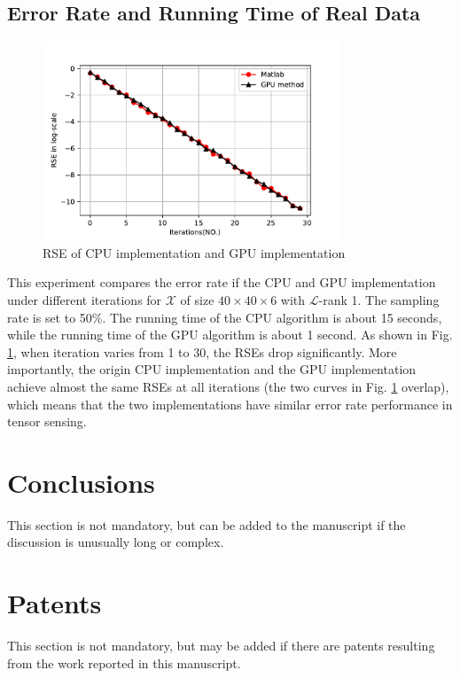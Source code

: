 \documentclass[journal,article,submit,moreauthors,pdftex,10pt,a4paper]{Definitions/mdpi}
\theoremstyle{plain}
\theoremstyle{definition}
\theoremstyle{remark}
\begin{document}
\subsection{Error Rate and Running Time of Real Data}
\begin{figure}[t]
    \centering
    \includegraphics[width=3.5in]{rse.pdf}
    \caption{RSE of CPU implementation and GPU implementation}
    \label{pic:rse}
\end{figure}

This experiment compares the error rate if the CPU and GPU implementation under different iterations for $\mathcal{X}$ of size $40 \times 40 \times 6$ with $\mathcal{L}$-rank 1. The sampling rate is set to 50\%. The running time of the CPU algorithm is about 15 seconds, while the running time of the GPU algorithm is about 1 second. As shown in Fig. \ref{pic:rse}, when iteration varies from 1 to 30, the RSEs drop significantly. More importantly, the origin CPU implementation and the GPU implementation achieve almost the same RSEs at all iterations (the two curves in Fig. \ref{pic:rse} overlap), which means that the two implementations have similar error rate performance in tensor sensing.

\section{Conclusions}

This section is not mandatory, but can be added to the manuscript if the discussion is unusually long or complex.

\section{Patents}
This section is not mandatory, but may be added if there are patents resulting from the work reported in this manuscript.

\vspace{6pt} 
\end{document}
